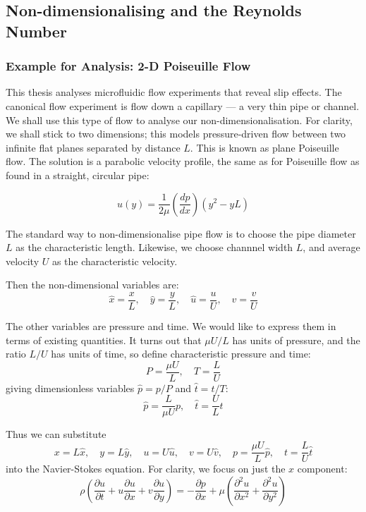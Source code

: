 \documentclass[12pt, a4paper, twoside, openright]{book}
\begin{document}
\clearpage
\subsection{Non-dimensionalising and the Reynolds Number}
\subsubsection{Example for Analysis: 2-D Poiseuille Flow}
This thesis analyses microfluidic flow experiments that reveal slip effects.  The canonical flow experiment is flow down a capillary --- a very thin pipe or channel.  
We shall use this type of flow to analyse our non-dimensionalisation.  For clarity, we shall stick to two dimensions; this models pressure-driven flow between two infinite flat planes separated by distance $L$.
This is known as plane Poiseuille flow.  The solution is a parabolic velocity profile, the same as for Poiseuille flow as found in a straight, circular pipe:

\begin{equation}
u(y) = \frac{1}{2 \mu} \left( \frac{dp}{dx} \right) \left( y^2 - yL \right)
\end{equation}

The standard way to non-dimensionalise pipe flow is to choose the pipe diameter $L$ as the characteristic length.  Likewise, we choose channnel width $L$, and average velocity $U$ as the characteristic velocity.


Then the non-dimensional variables are:
\begin{equation}
\hat{x} = \frac{x}{L}, \quad \hat{y} = \frac{y}{L}, \quad
 \hat{u} = \frac{u}{U}, \quad \hat{v} = \frac{v}{U}
\end{equation}

The other variables are pressure and time.  We would like to express them in terms of existing quantities.
It turns out that $ \mu U / L $ has units of pressure, and the ratio $L /U$ has units of time, so define characteristic pressure and time:
\begin{equation}
P = \frac{\mu U}{L}, \quad T = \frac{L}{U}
\end{equation}
giving dimensionless variables $\hat{p} = p/P$ and $\hat{t}=t/T$:
\begin{equation}
\hat{p} = \frac{L}{\mu U} p, \quad \hat{t} = \frac{U}{L}t
\end{equation}

Thus we can substitute
\begin{equation}
x = L\hat{x}, \quad y = L\hat{y}, \quad u = U \hat{u}, \quad v = U \hat{v}, 
\quad p = \frac{\mu U}{L}\hat{p}, \quad t = \frac{L}{U}\hat{t}
\end{equation}
into the Navier-Stokes equation.  For clarity, we focus on just the $x$ component:
\begin{equation}
\rho \left( \frac{\partial u}{\partial t} +
 u \frac{\partial u}{\partial x} + v\frac{\partial u}{\partial y} \right) =
 - \frac{\partial p}{\partial x} + 
\mu \left( \frac{\partial^2 u}{\partial x^2} + \frac{\partial^2 u}{\partial y^2} \right)
\end{equation}
\end{document}
